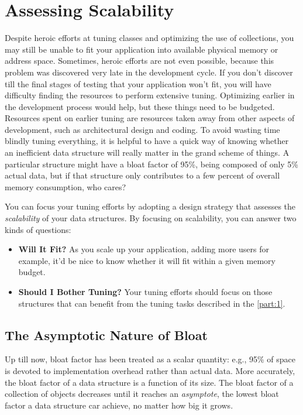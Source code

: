 \chapter{Assessing Scalability}

Despite heroic efforts at tuning classes and optimizing the use of collections,
you may still be unable to fit your application into available physical memory
or address space. Sometimes, heroic efforts are not even possible, because this
problem was discovered very late in the development cycle. If you don't discover
till the final stages of testing that your application won't fit, you will have
difficulty finding the resources to perform extensive tuning. Optimizing earlier
in the development process would help, but these things need to be budgeted.
Resources spent on earlier tuning are resources taken away from other aspects of
development, such as architectural design and coding. To avoid wasting time
blindly tuning everything, it is helpful to have a quick way of knowing whether
an inefficient data structure will really matter in the grand scheme of things.
A particular structure might have a bloat factor of 95\%, being composed of only
5\% actual data, but if that structure only contributes to a few percent of
overall memory consumption, who cares?

You can focus your tuning efforts by adopting a design strategy that assesses
the \emph{scalability} of your data structures. By focusing on scalability, you
can answer two kinds of questions:

\begin{itemize}
  \item \textbf{Will It Fit?} As you scale up your application, adding more
  users for example, it'd be nice to know whether it will fit
  within a given memory budget. 
  \item \textbf{Should I Bother Tuning?} Your tuning efforts should focus 
on those structures that can benefit from the tuning tasks described in
the \autoref{part:1}. 
\end{itemize}

\section{The Asymptotic Nature of Bloat}
Up till now, bloat factor has been treated as a scalar quantity: e.g., 95\% of
space is devoted to implementation overhead rather than actual data. More
accurately, the bloat factor of a data structure is a function of its size. The
bloat factor of a collection of objects decreases until it reaches an
\emph{asymptote}, the lowest bloat factor a data structure car achieve, no
matter how big it grows.

